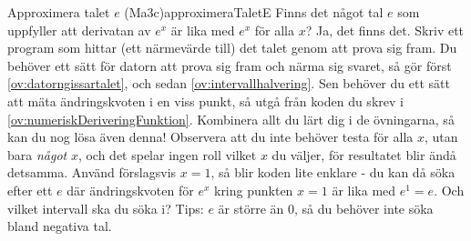 \begin{matteovnings}{Approximera talet $e$ (Ma3c)}{approximeraTaletE}
Finns det något tal $e$ som uppfyller att derivatan av $e^x$ är lika med $e^x$ för alla $x$? Ja, det finns det. Skriv ett program som hittar (ett närmevärde till) det talet genom att prova sig fram.
\newline
\newline
Du behöver ett sätt för datorn att prova sig fram och närma sig svaret, så gör först \autoref{ov:datorngissartalet}, och sedan \autoref{ov:intervallhalvering}.
\newline
\newline
Sen behöver du ett sätt att mäta ändringskvoten i en viss punkt, så utgå från koden du skrev i \autoref{ov:numeriskDeriveringFunktion}. Kombinera allt du lärt dig i de övningarna, så kan du nog lösa även denna!
\newline
\newline
Observera att du inte behöver testa för alla $x$, utan bara \emph{något} $x$, och det spelar ingen roll vilket $x$ du väljer, för resultatet blir ändå detsamma. Använd förslagsvis $x=1$, så blir koden lite enklare - du kan då söka efter ett $e$ där ändringskvoten för $e^x$ kring punkten $x=1$ är lika med $e^1 = e$. Och vilket intervall ska du söka i? Tips: $e$ är större än $0$, så du behöver inte söka bland negativa tal.
\end{matteovnings}
